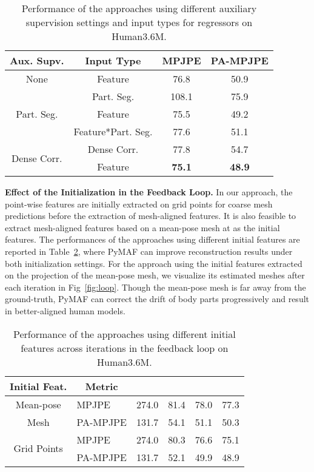 \documentclass[10pt,twocolumn,letterpaper]{article}
\begin{document}
\begin{table}[t]
\footnotesize
  \centering
    \begin{tabular}{c|c|cc}
    \toprule
    Aux. Supv. & Input Type & MPJPE & PA-MPJPE \\
    \midrule
    None  & Feature & 76.8  & 50.9 \\
    \midrule
    \multirow{3}[2]{*}{Part. Seg.} & Part. Seg. & 108.1 & 75.9 \\
          & Feature & 75.5  & 49.2 \\
          & Feature*Part. Seg. & 77.6  & 51.1 \\
    \midrule
    \multirow{2}[2]{*}{Dense Corr.} & Dense Corr. & 77.8  & 54.7 \\
          & Feature & \textbf{75.1} & \textbf{48.9} \\
    \bottomrule
    \end{tabular}\caption{Performance of the approaches using different auxiliary supervision settings and input types for regressors on Human3.6M.}
    \vspace{-6mm}
  \label{tab:AuxSupv}\end{table}



\textbf{Effect of the Initialization in the Feedback Loop.}
In our approach, the point-wise features are initially extracted on grid points for coarse mesh predictions before the extraction of mesh-aligned features.
It is also feasible to extract mesh-aligned features based on a mean-pose mesh at  as the initial features.
The performances of the approaches using different initial features are reported in Table~\ref{tab:iter}, where PyMAF can improve reconstruction results under both initialization settings.
For the approach using the initial features extracted on the projection of the mean-pose mesh, we visualize its estimated meshes after each iteration in Fig~\ref{fig:loop}.
Though the mean-pose mesh is far away from the ground-truth, PyMAF can correct the drift of body parts progressively and result in better-aligned human models.


\begin{table}[t]
\footnotesize
  \centering
    \begin{tabular}{c|l|cccc}
    \toprule
    Initial Feat. & \multicolumn{1}{c|}{Metric} &  &  &  &  \\
    \midrule
    Mean-pose & MPJPE & 274.0 & 81.4  & 78.0  & 77.3 \\
    Mesh  & PA-MPJPE & 131.7 & 54.1  & 51.1  & 50.3 \\
    \midrule
    \multirow{2}[2]{*}{Grid Points} & MPJPE & 274.0 & 80.3  & 76.6  & 75.1 \\
          & PA-MPJPE & 131.7 & 52.1  & 49.9  & 48.9 \\
    \bottomrule
    \end{tabular}\vspace{-1mm}
    \caption{Performance of the approaches using different initial features across iterations in the feedback loop on Human3.6M.}
    \vspace{-2mm}
  \label{tab:iter}\end{table}
\end{document}
